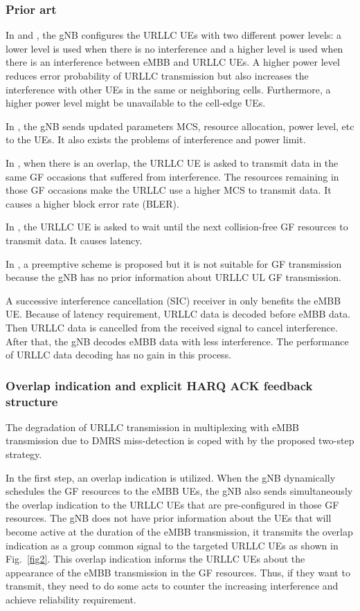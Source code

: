 \documentclass{ieeeaccess}
\begin{document}
\subsubsection{Prior art}

In \cite{ref13} and \cite {ref14}, the gNB configures the URLLC UEs with two different power levels: a lower level is used when there is no interference and a higher level is used when there is an interference between eMBB and URLLC UEs. A higher power level reduces error probability of URLLC transmission but also increases the interference with other UEs in the same or neighboring cells. Furthermore, a higher power level might be unavailable to the cell-edge UEs.

In \cite{ref15}, the gNB sends updated parameters MCS, resource allocation, power level, etc to the UEs. It also exists the problems of interference and power limit.

In \cite{ref16}, when there is an overlap, the URLLC UE is asked to transmit data in the same GF occasions that suffered from interference. The resources remaining in those GF occasions make the URLLC use a higher MCS to transmit data. It causes a higher block error rate (BLER).

In \cite{ref17}, the URLLC UE is asked to wait until the next collision-free GF resources to transmit data. It causes latency.

In \cite{ref18}, a preemptive scheme is proposed but it is not suitable for GF transmission because the gNB has no prior information about URLLC UL GF transmission.

A successive interference cancellation (SIC) receiver in \cite{ref19} only benefits the eMBB UE. Because of latency requirement, URLLC data is decoded before eMBB data. Then URLLC data is cancelled from the received signal to cancel interference. After that, the gNB decodes eMBB data with less interference. The performance of URLLC data decoding has no gain in this process.

\subsubsection{Overlap indication and explicit HARQ ACK feedback structure}\label{IIB2}

The degradation of URLLC transmission in multiplexing with eMBB transmission due to DMRS miss-detection is coped with by the proposed two-step strategy.

In the first step, an overlap indication is utilized. When the gNB dynamically schedules the GF resources to the eMBB UEs, the gNB also sends simultaneously the overlap indication to the URLLC UEs that are pre-configured in those GF resources. The gNB does not have prior information about the UEs that will become active at the duration of the eMBB transmission, it transmits the overlap indication as a group common signal to the targeted URLLC UEs as shown in Fig.~\ref{fig2}. This overlap indication informs the URLLC UEs about the appearance of the eMBB transmission in the GF resources. Thus, if they want to transmit, they need to do some acts to counter the increasing interference and achieve reliability requirement.
\end{document}
